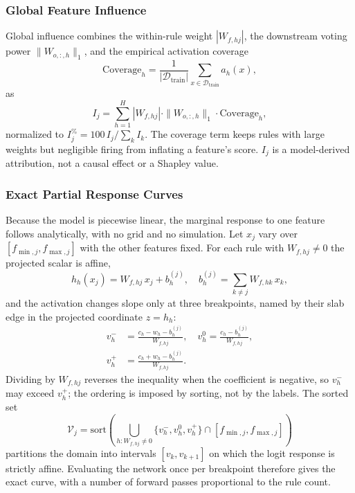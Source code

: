 \subsubsection{Global Feature Influence}
Global influence combines the within-rule weight $|W_{f,hj}|$, the downstream
voting power $\|W_{o,:,h}\|_1$, and the empirical activation coverage
\begin{equation}
\text{Coverage}_h = \frac{1}{|\mathcal{D}_{\text{train}}|} \sum_{x \in \mathcal{D}_{\text{train}}} a_h(x),
\end{equation}
as
\begin{equation}
\label{eq:feature_influence}
I_j = \sum_{h=1}^H |W_{f,hj}| \cdot \|W_{o,:,h}\|_1 \cdot \text{Coverage}_h,
\end{equation}
normalized to $I_j^{\%} = 100\,I_j / \sum_k I_k$. The coverage term keeps rules
with large weights but negligible firing from inflating a feature's score. $I_j$
is a model-derived attribution, not a causal effect or a Shapley value.

\subsubsection{Exact Partial Response Curves}
Because the model is piecewise linear, the marginal response to one feature
follows analytically, with no grid and no simulation. Let $x_j$ vary over
$[f_{\min, j}, f_{\max, j}]$ with the other features fixed. For each rule with
$W_{f,hj} \ne 0$ the projected scalar is affine,
\begin{equation}
h_h(x_j) = W_{f,hj} \, x_j + b_h^{(j)}, \quad b_h^{(j)} = \sum_{k \ne j} W_{f,hk} \, x_k,
\end{equation}
and the activation changes slope only at three breakpoints, named by their slab
edge in the projected coordinate $z = h_h$:
\begin{align}
\label{eq:breakpoints}
v_{h}^{-} &= \frac{c_h - w_h - b_h^{(j)}}{W_{f,hj}}, \quad
v_{h}^{0} = \frac{c_h - b_h^{(j)}}{W_{f,hj}}, \nonumber \\
v_{h}^{+} &= \frac{c_h + w_h - b_h^{(j)}}{W_{f,hj}}.
\end{align}
Dividing by $W_{f,hj}$ reverses the inequality when the coefficient is negative, so
$v_h^{-}$ may exceed $v_h^{+}$; the ordering is imposed by sorting, not by the
labels. The sorted set
\begin{equation}
\mathcal{V}_j = \text{sort}\left( \bigcup_{h : W_{f,hj} \ne 0} \{ v_h^{-}, v_h^{0}, v_h^{+} \} \cap [f_{\min, j}, f_{\max, j}] \right)
\end{equation}
partitions the domain into intervals $[v_k, v_{k+1}]$ on which the logit response
is strictly affine. Evaluating the network once per breakpoint therefore gives the
exact curve, with a number of forward passes proportional to the rule count.

